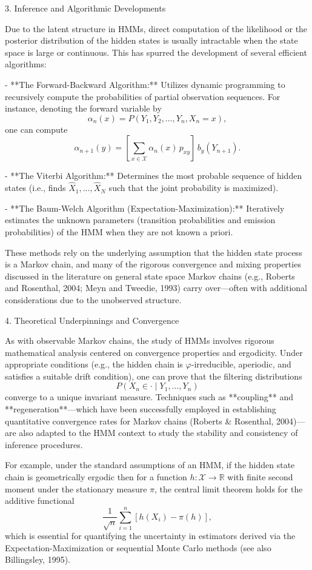 \documentclass[12pt,a4paper]{article}
\begin{document}
3. Inference and Algorithmic Developments

Due to the latent structure in HMMs, direct computation of the likelihood or the posterior distribution of the hidden states is usually intractable when the state space is large or continuous. This has spurred the development of several efficient algorithms:

- **The Forward-Backward Algorithm:** Utilizes dynamic programming to recursively compute the probabilities of partial observation sequences. For instance, denoting the forward variable by
  \[
  \alpha_n(x) = P(Y_1, Y_2, \dots, Y_n, X_n = x),
  \]
  one can compute
  \[
  \alpha_{n+1}(y) = \left[\sum_{x \in \mathcal{X}} \alpha_n(x) \, p_{xy}\right]\, b_y(Y_{n+1}).
  \]
  
- **The Viterbi Algorithm:** Determines the most probable sequence of hidden states (i.e., finds \(\hat{X}_1, \dots, \hat{X}_N\) such that the joint probability is maximized).
  
- **The Baum-Welch Algorithm (Expectation-Maximization):** Iteratively estimates the unknown parameters (transition probabilities and emission probabilities) of the HMM when they are not known a priori.

These methods rely on the underlying assumption that the hidden state process is a Markov chain, and many of the rigorous convergence and mixing properties discussed in the literature on general state space Markov chains (e.g., Roberts and Rosenthal, 2004; Meyn and Tweedie, 1993) carry over—often with additional considerations due to the unobserved structure.

4. Theoretical Underpinnings and Convergence

As with observable Markov chains, the study of HMMs involves rigorous mathematical analysis centered on convergence properties and ergodicity. Under appropriate conditions (e.g., the hidden chain is \(\varphi\)-irreducible, aperiodic, and satisfies a suitable drift condition), one can prove that the filtering distributions
\[
P(X_n \in \cdot \mid Y_1, \dots, Y_n)
\]
converge to a unique invariant measure. Techniques such as **coupling** and **regeneration**—which have been successfully employed in establishing quantitative convergence rates for Markov chains (Roberts \& Rosenthal, 2004)—are also adapted to the HMM context to study the stability and consistency of inference procedures.

For example, under the standard assumptions of an HMM, if the hidden state chain is geometrically ergodic then for a function \(h : \mathcal{X} \to \mathbb{R}\) with finite second moment under the stationary measure \(\pi\), the central limit theorem holds for the additive functional
\[
\frac{1}{\sqrt{n}} \sum_{i=1}^n \left[h(X_i) - \pi(h)\right],
\]
which is essential for quantifying the uncertainty in estimators derived via the Expectation-Maximization or sequential Monte Carlo methods (see also Billingsley, 1995).
\end{document}
